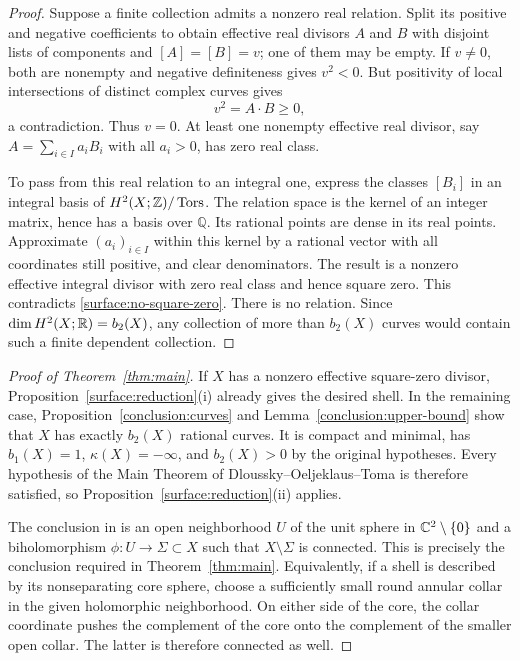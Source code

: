 \begin{proof}
Suppose a finite collection admits a nonzero real relation. Split its
positive and negative coefficients to obtain effective real divisors
$A$ and $B$ with disjoint lists of components and $[A]=[B]=v$; one of
them may be empty. If $v\neq0$, both are nonempty and negative
definiteness gives $v^2<0$. But positivity of local intersections of
distinct complex curves gives
\[
 v^2=A\cdot B\geq0,
\]
a contradiction. Thus $v=0$. At least one nonempty effective real
divisor, say $A=\sum_{i\in I}a_i B_i$ with all $a_i>0$, has zero real
class.

To pass from this real relation to an integral one, express the classes
$[B_i]$ in an integral basis of $H^2(X;\mathbb Z)/\operatorname{Tors}$.
The relation space is the kernel of an integer matrix, hence has a
basis over $\mathbb Q$. Its rational points are dense in its real
points. Approximate $(a_i)_{i\in I}$ within this kernel by a rational
vector with all coordinates still positive, and clear denominators.
The result is a nonzero effective integral divisor with zero real
class and hence square zero. This contradicts
\eqref{surface:no-square-zero}. There is no relation. Since
$\dim H^2(X;\mathbb R)=b_2(X)$, any collection of more than $b_2(X)$ curves
would contain such a finite dependent collection.
\end{proof}

\begin{proof}[Proof of Theorem~\ref{thm:main}]
If $X$ has a nonzero effective square-zero divisor,
Proposition~\ref{surface:reduction}\textup{(i)} already gives the
desired shell. In the remaining case,
Proposition~\ref{conclusion:curves} and
Lemma~\ref{conclusion:upper-bound} show that $X$ has exactly $b_2(X)$
rational curves. It is compact and minimal, has $b_1(X)=1$,
$\kappa(X)=-\infty$, and $b_2(X)>0$ by the original hypotheses.
Every hypothesis of the Main Theorem of Dloussky--Oeljeklaus--Toma is
therefore satisfied, so Proposition~\ref{surface:reduction}\textup{(ii)}
applies.

The conclusion in \cite[pp.~283--284]{DOT2003} is an open neighborhood
$U$ of the unit sphere in $\mathbb C^2\setminus\{0\}$ and a biholomorphism
$\phi:U\to\Sigma\subset X$ such that $X\setminus\Sigma$ is connected.
This is precisely the conclusion required in Theorem~\ref{thm:main}.
Equivalently, if a shell is described by its nonseparating core sphere,
choose a sufficiently small round annular collar in the given
holomorphic neighborhood. On either side of the core, the collar
coordinate pushes the complement of the core onto the complement of
the smaller open collar. The latter is therefore connected as well.
\end{proof}

